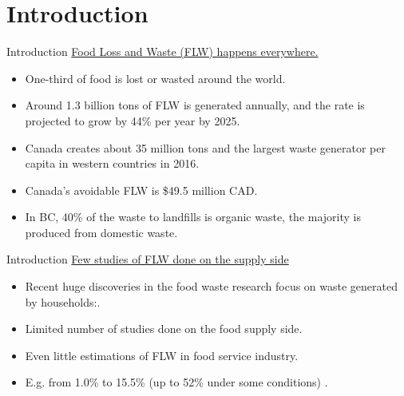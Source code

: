 \documentclass{beamer}
\begin{document}
\section{Introduction}
\begin{frame}{Introduction}
    \underline{Food Loss and Waste (FLW) happens everywhere.}
    \begin{itemize}
        \item One-third of food is lost or wasted around the world\cite{Gustavsson2011-em}.
        \item Around 1.3 billion tons of FLW is generated annually, and the rate is projected to grow by 44\% per year by 2025\cite{Blakeney2019-jk}.
    \end{itemize}
    \begin{itemize}
        \item Canada creates about 35 million tons and the largest waste generator per capita in western countries in 2016\cite{Nzwc2016-jl}.
        \item Canada's avoidable FLW is \$49.5 million CAD\cite{Gooch2019-gd}.
    \end{itemize}
    \begin{itemize}
        \item In BC, 40\% of the waste to landfills is organic waste, the majority is produced from domestic waste\cite{BCwaste}.
    \end{itemize}
\end{frame}

\begin{frame}{Introduction}
    \underline{Few studies of FLW done on the supply side}
    \begin{itemize}
        \item Recent huge discoveries in the food waste research focus on waste generated by households:\cite{Aschemann-Witzel2015-xj,Lusk2017-xm,Nahman2012-ys,Von_Massow2019-qa}.
    \end{itemize}

    \begin{itemize}
        \item Limited number of studies done on the food supply side.
        \item Even little estimations of FLW in food service industry.
        \item E.g. from 1.0\% to 15.5\% (up to 52\% under some conditions) \cite{Ministry_of_Environment_And_Climate_Change_Strategy2018-sk}. 
    \end{itemize}
\end{frame}
\end{document}
